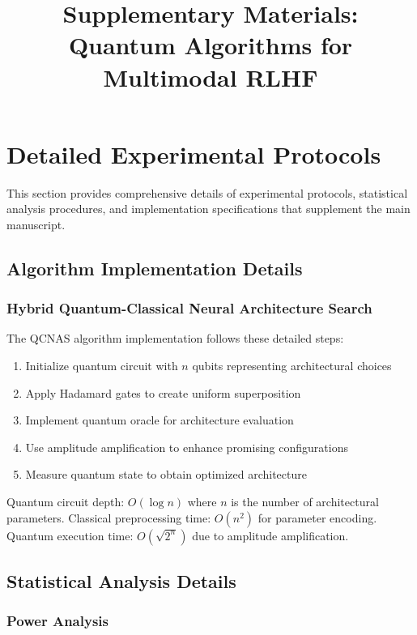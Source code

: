 \documentclass{article}
\title{Supplementary Materials: Quantum Algorithms for Multimodal RLHF}
\begin{document}
\maketitle

\section{Detailed Experimental Protocols}

This section provides comprehensive details of experimental protocols, statistical analysis procedures, and implementation specifications that supplement the main manuscript.

\subsection{Algorithm Implementation Details}

\subsubsection{Hybrid Quantum-Classical Neural Architecture Search}

The QCNAS algorithm implementation follows these detailed steps:

\begin{enumerate}
\item Initialize quantum circuit with $n$ qubits representing architectural choices
\item Apply Hadamard gates to create uniform superposition
\item Implement quantum oracle for architecture evaluation
\item Use amplitude amplification to enhance promising configurations
\item Measure quantum state to obtain optimized architecture
\end{enumerate}

Quantum circuit depth: $O(\log n)$ where $n$ is the number of architectural parameters.
Classical preprocessing time: $O(n^2)$ for parameter encoding.
Quantum execution time: $O(\sqrt{2^n})$ due to amplitude amplification.

\subsection{Statistical Analysis Details}

\subsubsection{Power Analysis}
\end{document}
